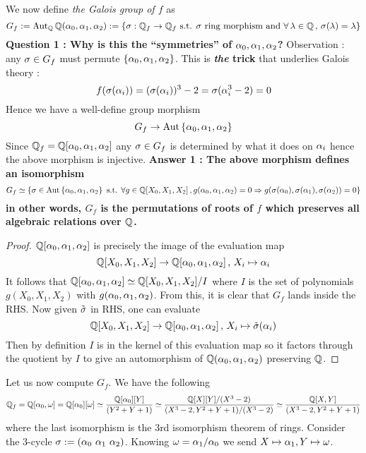\documentclass{article}
\begin{document}
We now define \emph{the Galois group of $f$} as \[
  G_f := \operatorname{Aut}_{\mathbb{Q}} \mathbb{Q}(\alpha_0 , \alpha_1 , \alpha_2)
  := \left\{\sigma : \mathbb{Q}_f \to \mathbb{Q}_f \text{ s.t. } \sigma \text{ ring morphism and }
  \forall\,\lambda \in \mathbb{Q}\,,\,\sigma(\lambda) = \lambda\right\}
\]
\textbf{Question 1 : Why is this the ``symmetries'' of $\alpha_0 , \alpha_1 ,\alpha_2$?}
Observation : any $\sigma \in G_f$ must permute $\left\{\alpha_0 , \alpha_1 , \alpha_2\right\}$.
This is \textbf{\emph{the} trick} that underlies Galois theory : \[
  f(\sigma(\alpha_i)) = (\sigma(\alpha_i))^3 - 2 = \sigma(\alpha_i^3 - 2) = 0
\]
Hence we have a well-define group morphism \[
  G_f \to \operatorname{Aut}\left\{\alpha_0 , \alpha_1 , \alpha_2\right\}
\]
Since $\mathbb{Q}_f = \mathbb{Q}[\alpha_0 , \alpha_1 ,\alpha_2]$ any $\sigma \in G_f$
is determined by what it does on $\alpha_i$ hence the above morphism is injective.
\textbf{Answer 1 : The above morphism defines an isomorphism}
\[
  G_f \simeq \left\{
    \sigma \in \operatorname{Aut}\left\{\alpha_0 ,\alpha_1 ,\alpha_2\right\} \text{ s.t. } 
    \forall g \in \mathbb{Q}[X_0 , X_1 , X_2] \,,
    g(\alpha_0 , \alpha_1 ,\alpha_2) = 0 \Rightarrow
    g(\sigma(\alpha_0) , \sigma(\alpha_1) , \sigma(\alpha_2)) = 0
  \right\}
\]
\textbf{in other words, $G_f$ is the permutations of roots of $f$
which preserves all algebraic relations over $\mathbb{Q}$.}
\begin{proof}
  $\mathbb{Q}[\alpha_0 , \alpha_1 , \alpha_2]$ is precisely the image of 
  the evaluation map \[
    \mathbb{Q}[X_0 , X_1 , X_2] \to \mathbb{Q}[\alpha_0 , \alpha_1 , \alpha_2] \,,\,X_i \mapsto \alpha_i
  \]
  It follows that $
    \mathbb{Q}[\alpha_0 , \alpha_1 , \alpha_2] \simeq 
    \mathbb{Q}[X_0 , X_1 , X_2] / I
  $ where $I$ is the set of polynomials $g(X_0 , X_1 , X_2)$ with
  $g(\alpha_0 , \alpha_1 , \alpha_2)$.
  From this, it is clear that $G_f$ lands inside the RHS.
  Now given $\tilde{\sigma}$ in RHS,
  one can evaluate \[
    \mathbb{Q}[X_0 , X_1 , X_2] \to \mathbb{Q}[\alpha_0 , \alpha_1 ,\alpha_2] \,,\, 
    X_i \mapsto \tilde{\sigma}(\alpha_i)
  \]
  Then by definition $I$ is in the kernel of this evaluation map
  so it factors through the quotient by $I$ to give
  an automorphism of $\mathbb{Q}(\alpha_0 , \alpha_1 , \alpha_2)$ preserving $\mathbb{Q}$.
\end{proof}
Let us now compute $G_f$. We have the following
\begin{align*}
  \mathbb{Q}_f = \mathbb{Q}[\alpha_0 , \omega] 
  = \mathbb{Q}[\alpha_0][\omega]
  \simeq \frac{\mathbb{Q}[\alpha_0][Y]}{(Y^2 + Y + 1)}
  \simeq \frac{\mathbb{Q}[X][Y]/(X^3 - 2)}{(X^3 - 2 , Y^2 + Y + 1)/(X^3 - 2)}
  \simeq \frac{\mathbb{Q}[X , Y]}{(X^3 - 2 , Y^2 + Y + 1)}
\end{align*}
where the last isomorphism is the 3rd isomorphism theorem of rings.
Consider the 3-cycle $\sigma := (\alpha_0 \,\, \alpha_1 \,\, \alpha_2)$.
Knowing $\omega = \alpha_1 / \alpha_0$ we send $X \mapsto \alpha_1 , Y \mapsto \omega$.
\end{document}
